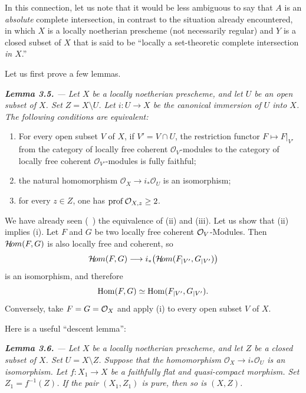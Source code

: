 \medskip
\noindent In this connection, let us note that it would be less ambiguous to
say that $A$ is an \emph{absolute} complete intersection, in contrast to the
situation already encountered, in which $X$ is a locally noetherian prescheme
(not necessarily regular) and $Y$ is a closed subset of $X$ that is said to
be ``locally a set-theoretic complete intersection \emph{in $X$}.''

\medskip
\noindent Let us first prove a few lemmas.

\medskip
{\itshape
{}\noindent\textbf{Lemma 3.5.} --- Let $X$ be a locally noetherian prescheme,
and let $U$ be an open subset of $X$. Set $Z=X\setminus U$. Let
$i\colon U\to X$ be the canonical immersion of $U$ into $X$. The following
conditions are equivalent:
\begin{enumerate}[label=\textup{(\roman*)},leftmargin=2.2em,itemsep=0.45em,topsep=0.45em]
\item For every open subset $V$ of $X$, if $V'=V\cap U$, the restriction
functor $F\longmapsto F|_{V'}$ from the category of locally free coherent
$\mathcal O_V$-modules to the category of locally free coherent
$\mathcal O_{V'}$-modules is fully faithful;
\item the natural homomorphism $\mathcal O_X\to i_*\mathcal O_U$ is an
isomorphism;
\item for every $z\in Z$, one has $\prof\mathcal O_{X,z}\geq 2$.
\end{enumerate}
}

We have already seen (~) the equivalence of (ii)
and (iii). Let us show that (ii) implies (i). Let $F$ and $G$ be two
locally free coherent $\Oo_V$-Modules. Then $\SheafHom(F,G)$ is also
locally free and coherent, so
$$
\SheafHom(F,G)\longrightarrow
i_\ast\bigl(\SheafHom(\sisi{F|{|V'}}{F_{|V'}},
\sisi{G|{|V'}}{G_{|V'}})\bigr)
$$
is an isomorphism, and therefore
$$
\Hom(F,G)\simeq
\Hom(\sisi{F|{|V'}}{F_{|V'}},\sisi{G|{|V'}}{G_{|V'}}).
$$
Conversely, take $F=G=\OX$ and apply (i) to every open subset $V$ of
$X$.

\medskip
\noindent Here is a useful ``descent lemma'':

\medskip
{\itshape
{}\noindent\textbf{Lemma 3.6.} --- Let $X$ be a locally noetherian prescheme,
and let $Z$ be a closed subset of $X$. Set $U=X\setminus Z$. Suppose that
the homomorphism $\mathcal O_X\to i_*\mathcal O_U$ is an isomorphism. Let
$f\colon X_1\to X$ be a faithfully flat and quasi-compact morphism. Set
$Z_1=f^{-1}(Z)$. If the pair $(X_1,Z_1)$ is pure, then so is $(X,Z)$.
}

